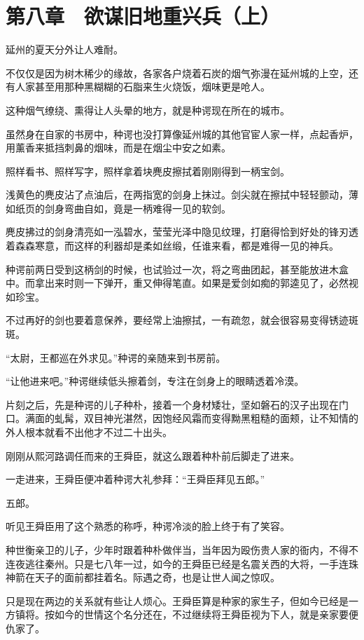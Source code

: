 \section{第八章　欲谋旧地重兴兵（上）}

延州的夏天分外让人难耐。

不仅仅是因为树木稀少的缘故，各家各户烧着石炭的烟气弥漫在延州城的上空，还有人家甚至用那种黑糊糊的石脂来生火烧饭，烟味更是呛人。

这种烟气缭绕、熏得让人头晕的地方，就是种谔现在所在的城市。

虽然身在自家的书房中，种谔也没打算像延州城的其他官宦人家一样，点起香炉，用薰香来抵挡刺鼻的烟味，而是在烟尘中安之如素。

照样看书、照样写字，照样拿着块麂皮擦拭着刚刚得到一柄宝剑。

浅黄色的麂皮沾了点油后，在两指宽的剑身上抹过。剑尖就在擦拭中轻轻颤动，薄如纸页的剑身弯曲自如，竟是一柄难得一见的软剑。

麂皮拂过的剑身清亮如一泓碧水，莹莹光泽中隐见纹理，打磨得恰到好处的锋刃透着森森寒意，而这样的利器却是柔如丝缎，任谁来看，都是难得一见的神兵。

种谔前两日受到这柄剑的时候，也试验过一次，将之弯曲团起，甚至能放进木盒中。而拿出来时则一下弹开，重又伸得笔直。如果是爱剑如痴的郭逵见了，必然视如珍宝。

不过再好的剑也要着意保养，要经常上油擦拭，一有疏忽，就会很容易变得锈迹斑斑。

“太尉，王都巡在外求见。”种谔的亲随来到书房前。

“让他进来吧。”种谔继续低头擦着剑，专注在剑身上的眼睛透着冷漠。

片刻之后，先是种谔的儿子种朴，接着一个身材矮壮，坚如磐石的汉子出现在门口。满面的虬髯，双目神光湛然，因饱经风霜而变得黝黑粗糙的面颊，让不知情的外人根本就看不出他才不过二十出头。

刚刚从熙河路调任而来的王舜臣，就这么跟着种朴前后脚走了进来。

一走进来，王舜臣便冲着种谔大礼参拜：“王舜臣拜见五郎。”

五郎。

听见王舜臣用了这个熟悉的称呼，种谔冷淡的脸上终于有了笑容。

种世衡亲卫的儿子，少年时跟着种朴做伴当，当年因为殴伤贵人家的衙内，不得不连夜逃往秦州。只是七八年一过，如今的王舜臣已经是名震关西的大将，一手连珠神箭在天子的面前都挂着名。际遇之奇，也是让世人闻之惊叹。

只是现在两边的关系就有些让人烦心。王舜臣算是种家的家生子，但如今已经是一方镇将。按如今的世情这个名分还在，不过继续将王舜臣视为下人，就是亲家要便仇家了。

